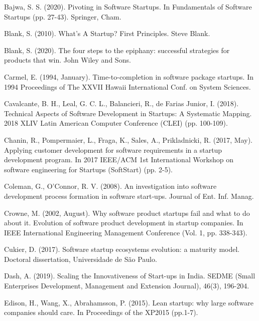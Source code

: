\documentclass[runningheads]{llncs}
\begin{document}

\begin{thebibliography}{108}

Bajwa, S. S. (2020). 
Pivoting in Software Startups. In Fundamentals of Software Startups (pp. 27-43). 
Springer, Cham.

Blank, S. (2010). 
What's A Startup? First Principles. 
Steve Blank.

Blank, S. (2020). 
The four steps to the epiphany: successful strategies for products that win. 
John Wiley and Sons.

Carmel, E. (1994, January). Time-to-completion in software package startups. In 1994 Proceedings of The XXVII Hawaii International Conf. on System Sciences.

Cavalcante, B. H., Leal, G. C. L., Balancieri, R., de Farias Junior, I. (2018). 
Technical Aspects of Software Development in Startups: A Systematic Mapping. 
2018 XLIV Latin American Computer Conference (CLEI) (pp. 100-109).

Chanin, R., Pompermaier, L., Fraga, K., Sales, A., Prikladnicki, R. (2017, May). 
Applying customer development for software requirements in a startup development program.
In 2017 IEEE/ACM 1st International Workshop on software engineering for Startups (SoftStart) (pp. 2-5).

Coleman, G., O'Connor, R. V. (2008).
An investigation into software development process formation in software start‐ups.
Journal of Ent. Inf. Manag.

Crowne, M. (2002, August). 
Why software product startups fail and what to do about it. Evolution of software product development in startup companies. 
In IEEE International Engineering Management Conference (Vol. 1, pp. 338-343).

Cukier, D. (2017). 
Software startup ecosystems evolution: a maturity model. 
Doctoral dissertation, Universidade de São Paulo.

Dash, A. (2019). 
Scaling the Innovativeness of Start-ups in India. 
SEDME (Small Enterprises Development, Management and Extension Journal), 46(3), 196-204.

Edison, H., Wang, X., Abrahamsson, P. (2015). 
Lean startup: why large software companies should care. 
In Proceedings of the XP2015 (pp.1-7).


\end{thebibliography}
\end{document}
